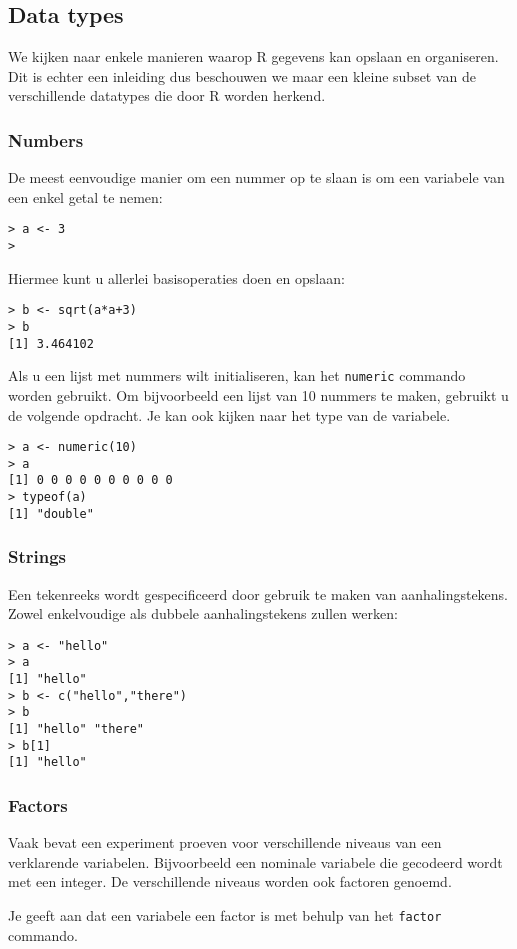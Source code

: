 \subsection{Data types}
We kijken naar enkele manieren waarop R gegevens kan opslaan en organiseren. Dit is echter een inleiding dus beschouwen we maar een kleine subset van de verschillende datatypes die door R worden herkend. 

\subsubsection{Numbers}
De meest eenvoudige manier om een nummer op te slaan is om een variabele van een enkel getal te nemen:
\begin{lstlisting}
> a <- 3
>
\end{lstlisting}
Hiermee kunt u allerlei basisoperaties doen en opslaan:
\begin{lstlisting}
> b <- sqrt(a*a+3)
> b
[1] 3.464102
\end{lstlisting}
Als u een lijst met nummers wilt initialiseren, kan het \texttt{numeric} commando worden gebruikt. Om bijvoorbeeld een lijst van 10 nummers te maken, gebruikt u de volgende opdracht. Je kan ook kijken naar het type van de variabele.
\begin{lstlisting}
> a <- numeric(10)
> a
[1] 0 0 0 0 0 0 0 0 0 0
> typeof(a)
[1] "double"
\end{lstlisting}

\subsubsection{Strings}
Een tekenreeks wordt gespecificeerd door gebruik te maken van aanhalingstekens. Zowel enkelvoudige als dubbele aanhalingstekens zullen werken:
\begin{lstlisting}
> a <- "hello"
> a
[1] "hello"
> b <- c("hello","there")
> b
[1] "hello" "there"
> b[1]
[1] "hello"
\end{lstlisting}

\subsubsection{Factors}
 Vaak bevat een experiment proeven voor verschillende niveaus van een  verklarende variabelen. Bijvoorbeeld een nominale variabele die gecodeerd wordt met een integer. De verschillende niveaus worden ook factoren genoemd.

Je geeft aan dat een variabele een factor is met behulp van het \texttt{factor} commando. 

